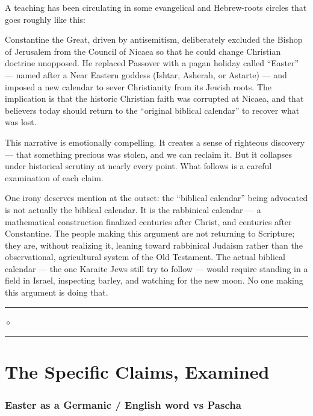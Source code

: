 \documentclass[10pt,twoside,openany]{book}
\newcommand{\ornrule}{%
  \par\bigskip
  {\noindent\hfil{\color{gold}\rule[0.5ex]{1.5in}{0.5pt}%
  \quad$\diamond$\quad%
  \rule[0.5ex]{1.5in}{0.5pt}}\hfil\par}%
  \bigskip
}
\begin{document}
A teaching has been circulating in some evangelical and Hebrew-roots circles that goes roughly like this:

\begin{quoting}
\small
Constantine the Great, driven by antisemitism, deliberately excluded
the Bishop of Jerusalem from the Council of Nicaea so that he could
change Christian doctrine unopposed. He replaced Passover with a
pagan holiday called ``Easter'' --- named after a Near Eastern goddess
(Ishtar, Asherah, or Astarte) --- and imposed a new calendar to sever
Christianity from its Jewish roots. The implication is that the
historic Christian faith was corrupted at Nicaea, and that believers
today should return to the ``original biblical calendar'' to recover
what was lost.
\end{quoting}

This narrative is emotionally compelling. It creates a sense of
righteous discovery --- that something precious was stolen, and we can
reclaim it. But it collapses under historical scrutiny at nearly every
point. What follows is a careful examination of each claim.

One irony deserves mention at the outset: the ``biblical calendar'' being
advocated is not actually the biblical calendar. It is the rabbinical
calendar --- a mathematical construction finalized centuries after Christ,
and centuries after Constantine. The people making this argument are not
returning to Scripture; they are, without realizing it, leaning toward
rabbinical Judaism rather than the observational, agricultural system of
the Old Testament. The actual biblical calendar --- the one Karaite Jews
still try to follow --- would require standing in a field in Israel,
inspecting barley, and watching for the new moon. No one making this
argument is doing that.

\ornrule



\part{The Specific Claims, Examined}



\section{Easter as a Germanic / English word vs Pascha}
\end{document}
